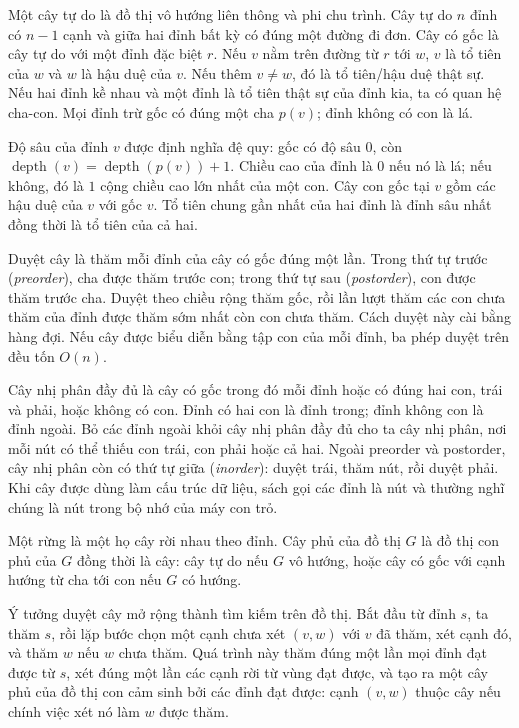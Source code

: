 \documentclass[11pt]{article}
\begin{document}
Một cây tự do là đồ thị vô hướng liên thông và phi chu trình. Cây tự do \(n\)
đỉnh có \(n-1\) cạnh và giữa hai đỉnh bất kỳ có đúng một đường đi đơn. Cây có
gốc là cây tự do với một đỉnh đặc biệt \(r\). Nếu \(v\) nằm trên đường từ \(r\)
tới \(w\), \(v\) là tổ tiên của \(w\) và \(w\) là hậu duệ của \(v\). Nếu thêm
\(v\ne w\), đó là tổ tiên/hậu duệ thật sự. Nếu hai đỉnh kề nhau và một đỉnh là
tổ tiên thật sự của đỉnh kia, ta có quan hệ cha-con. Mọi đỉnh trừ gốc có đúng
một cha \(p(v)\); đỉnh không có con là lá.

Độ sâu của đỉnh \(v\) được định nghĩa đệ quy: gốc có độ sâu \(0\), còn
\(\operatorname{depth}(v)=\operatorname{depth}(p(v))+1\). Chiều cao của đỉnh
là \(0\) nếu nó là lá; nếu không, đó là \(1\) cộng chiều cao lớn nhất của một
con. Cây con gốc tại \(v\) gồm các hậu duệ của \(v\) với gốc \(v\). Tổ tiên
chung gần nhất của hai đỉnh là đỉnh sâu nhất đồng thời là tổ tiên của cả hai.

Duyệt cây là thăm mỗi đỉnh của cây có gốc đúng một lần. Trong thứ tự trước
(\emph{preorder}), cha được thăm trước con; trong thứ tự sau
(\emph{postorder}), con được thăm trước cha. Duyệt theo chiều rộng thăm gốc,
rồi lần lượt thăm các con chưa thăm của đỉnh được thăm sớm nhất còn con chưa
thăm. Cách duyệt này cài bằng hàng đợi. Nếu cây được biểu diễn bằng tập con của
mỗi đỉnh, ba phép duyệt trên đều tốn \(O(n)\).

Cây nhị phân đầy đủ là cây có gốc trong đó mỗi đỉnh hoặc có đúng hai con, trái
và phải, hoặc không có con. Đỉnh có hai con là đỉnh trong; đỉnh không con là
đỉnh ngoài. Bỏ các đỉnh ngoài khỏi cây nhị phân đầy đủ cho ta cây nhị phân, nơi
mỗi nút có thể thiếu con trái, con phải hoặc cả hai. Ngoài preorder và
postorder, cây nhị phân còn có thứ tự giữa (\emph{inorder}): duyệt trái, thăm
nút, rồi duyệt phải. Khi cây được dùng làm cấu trúc dữ liệu, sách gọi các đỉnh
là nút và thường nghĩ chúng là nút trong bộ nhớ của máy con trỏ.

Một rừng là một họ cây rời nhau theo đỉnh. Cây phủ của đồ thị \(G\) là đồ thị
con phủ của \(G\) đồng thời là cây: cây tự do nếu \(G\) vô hướng, hoặc cây có
gốc với cạnh hướng từ cha tới con nếu \(G\) có hướng.

Ý tưởng duyệt cây mở rộng thành tìm kiếm trên đồ thị. Bắt đầu từ đỉnh \(s\), ta
thăm \(s\), rồi lặp bước chọn một cạnh chưa xét \((v,w)\) với \(v\) đã thăm,
xét cạnh đó, và thăm \(w\) nếu \(w\) chưa thăm. Quá trình này thăm đúng một lần
mọi đỉnh đạt được từ \(s\), xét đúng một lần các cạnh rời từ vùng đạt được, và
tạo ra một cây phủ của đồ thị con cảm sinh bởi các đỉnh đạt được: cạnh
\((v,w)\) thuộc cây nếu chính việc xét nó làm \(w\) được thăm.
\end{document}
